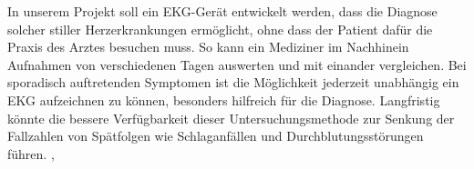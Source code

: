 In unserem Projekt soll ein EKG-Gerät entwickelt werden, dass die Diagnose solcher stiller Herzerkrankungen ermöglicht, ohne dass der Patient dafür die Praxis des Arztes besuchen muss. So kann ein Mediziner im Nachhinein Aufnahmen von verschiedenen Tagen auswerten und mit einander vergleichen. Bei sporadisch auftretenden Symptomen ist die Möglichkeit jederzeit unabhängig ein EKG aufzeichnen zu können, besonders hilfreich für die Diagnose. Langfristig könnte die bessere Verfügbarkeit dieser Untersuchungsmethode zur Senkung der Fallzahlen von Spätfolgen wie Schlaganfällen und Durchblutungsstörungen führen. \cite{Apothekenumschau}, \cite{Arztblatt}